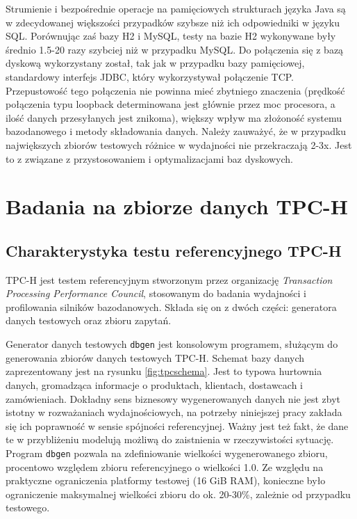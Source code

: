 \documentclass[12pt]{extarticle}
\begin{document}
    Strumienie i bezpośrednie operacje na pamięciowych strukturach języka Java są w zdecydowanej większości przypadków szybsze niż ich odpowiedniki w języku SQL. Porównując zaś bazy H2 i MySQL, testy na bazie H2 wykonywane były średnio 1.5-20 razy szybciej niż w przypadku MySQL.  Do połączenia się z bazą dyskową wykorzystany został, tak jak w przypadku bazy pamięciowej, standardowy interfejs JDBC, który wykorzystywał połączenie TCP. Przepustowość tego połączenia nie powinna mieć zbytniego znaczenia (prędkość połączenia typu loopback determinowana jest głównie przez moc procesora, a ilość danych przesyłanych jest znikoma), większy wpływ ma złożoność systemu bazodanowego i metody składowania danych. Należy zauważyć, że w przypadku największych zbiorów testowych różnice w wydajności nie przekraczają 2-3x. Jest to z związane z przystosowaniem i optymalizacjami baz dyskowych.


\section{Badania na zbiorze danych TPC-H} \label{tpc}

\subsection{Charakterystyka testu referencyjnego TPC-H}

    TPC-H jest testem referencyjnym stworzonym przez organizację \textit{Transaction Processing Performance Council}, stosowanym do badania wydajności i profilowania silników bazodanowych. Składa się on z dwóch części: generatora danych testowych oraz zbioru zapytań.

    Generator danych testowych \texttt{dbgen} jest konsolowym programem, służącym do generowania zbiorów danych testowych TPC-H. Schemat bazy danych zaprezentowany jest na rysunku \ref{fig:tpcschema}. Jest to typowa hurtownia danych, gromadząca informacje o produktach, klientach, dostawcach i zamówieniach. Dokładny sens biznesowy wygenerowanych danych nie jest zbyt istotny w rozważaniach wydajnościowych, na potrzeby niniejszej pracy zakłada się ich poprawność w sensie spójności referencyjnej. Ważny jest też fakt, że dane te w przybliżeniu modelują możliwą do zaistnienia w rzeczywistości sytuację. Program \texttt{dbgen} pozwala na zdefiniowanie wielkości wygenerowanego zbioru, procentowo względem zbioru referencyjnego o wielkości 1.0. Ze względu na praktyczne ograniczenia platformy testowej (16 GiB RAM), konieczne było ograniczenie maksymalnej wielkości zbioru do ok. 20-30\%, zależnie od przypadku testowego. 
\end{document}

